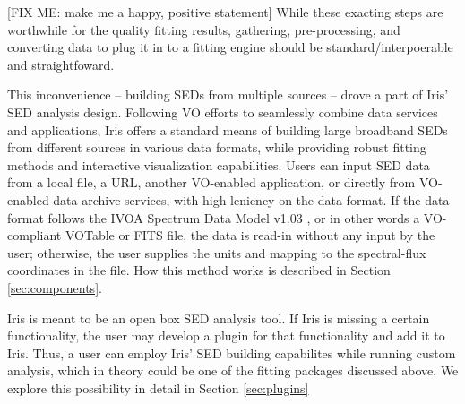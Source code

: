 [FIX ME: make me a happy, positive statement] While these exacting steps are worthwhile for the quality fitting results, gathering, pre-processing, and converting data to plug it in to a fitting engine should be standard/interpoerable and straightfoward. 

This inconvenience -- building SEDs from multiple sources -- drove a part of Iris' SED analysis design. Following VO efforts to seamlessly combine data services and applications, Iris offers a standard means of building large broadband SEDs from different sources in various data formats, while providing robust fitting methods and interactive visualization capabilities. Users can input SED data from a local file, a URL, another VO-enabled application, or directly from VO-enabled data archive services, with high leniency on the data format. If the data format follows the IVOA Spectrum Data Model v1.03 \citep{2012arXiv1204.3055M}, or in other words a VO-compliant VOTable or FITS file, the data is read-in without any input by the user; otherwise, the user supplies the units and  mapping to the spectral-flux coordinates in the file. How this method works is described in Section \ref{sec:components}.

Iris is meant to be an open box SED analysis tool. If Iris is missing a certain functionality, the user may develop a plugin for that functionality and add it to Iris. Thus, a user can employ Iris' SED building capabilites while running custom analysis, which in theory could be one of the fitting packages discussed above. We explore this possibility in detail in Section \ref{sec:plugins}


%
